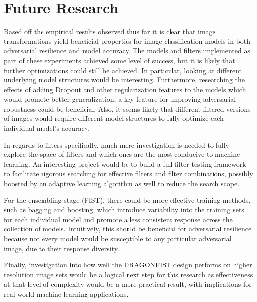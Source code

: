 \section{Future Research} \label{s:futureresearch}
Based off the empirical results observed thus far it is clear that image transformations yield beneficial properties for image classification models in both adversarial resilience and model accuracy.
The models and filters implemented as part of these experiments achieved some level of success, but it is likely that further optimizations could still be achieved.
In particular, looking at different underlying model structures would be interesting.
Furthermore, researching the effects of adding Dropout and other regularization features to the models which would promote better generalization, a key feature for improving adversarial robustness could be beneficial.
Also, it seems likely that different filtered versions of images would require different model structures to fully optimize each individual model's accuracy.

In regards to filters specifically, much more investigation is needed to fully explore the space of filters and which ones are the most conducive to machine learning.
An interesting project would be to build a full filter testing framework to facilitate rigorous searching for effective filters and filter combinations, possibly boosted by an adaptive learning algorithm as well to reduce the search scope.

For the ensembling stage (FIST), there could be more effective training methods, such as bagging and boosting, which introduce variability into the training sets for each individual model and promote a less consistent response across the collection of models.
Intuitively, this should be beneficial for adversarial resilience because not every model would be susceptible to any particular adversarial image, due to their response diversity.

Finally, investigation into how well the DRAGONFIST design performs on higher resolution image sets would be a logical next step for this research as effectiveness at that level of complexity would be a more practical result, with implications for real-world machine learning applications.
